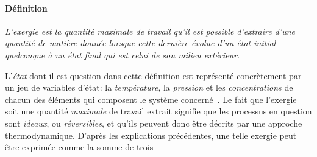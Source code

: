 \documentclass[a4paper,11pt]{scrartcl}
\begin{document}
\paragraph{Définition} \textsl{L'exergie est la quantité maximale de travail
qu'il est possible d'extraire d'une quantité de matière donnée lorsque cette
dernière évolue d'un état initial quelconque à un état final qui est celui de
son milieu extérieur.}

\bigskip

L'\emph{état} dont il est question dans cette définition est représenté
concrètement par un jeu de variables d'état: la \emph{température}, la
\emph{pression} et les \emph{concentrations} de chacun des éléments qui
composent le système concerné~\cite{TI-BE8015}. Le fait que l'exergie soit une quantité \emph{maximale} de travail extrait signifie que les processus en question sont \emph{ideaux}, ou \emph{réversibles}, et qu'ils peuvent donc être décrits par une approche thermodynamique. D'après les explications
précédentes, une telle exergie peut être exprimée comme la somme de trois
\end{document}
